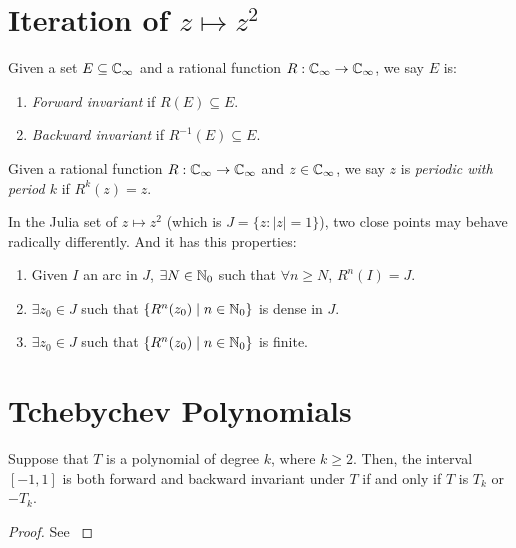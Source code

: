 \section{Iteration of $z \mapsto z^2$}
\label{sec:iteratcion_of_z_squared}

\begin{definition}
    Given a set $E \subseteq \mathbb{C}_\infty$ and a rational function $R: \mathbb{C}_\infty \to
    \mathbb{C}_\infty$, we say $E$ is:
    \begin{enumerate}[label=(\alph*)]
        \item \emph{Forward invariant} if $R(E) \subseteq E$.
        \item \emph{Backward invariant} if $R^{-1}(E) \subseteq E$.
    \end{enumerate}
\end{definition}

\begin{definition}
    Given a rational function $R: \mathbb{C}_\infty \to \mathbb{C}_\infty$ and $z \in \mathbb{C}_\infty$, we say $z$
    is \emph{periodic with period $k$} if $R^k(z) = z$.
\end{definition}

In the Julia set of $z \mapsto z^2$ (which is $J = \{z : |z| = 1\}$), two close
points may behave radically differently. And it has this properties:
\begin{enumerate}[label=(\roman*)]
    \item Given $I$ an arc in $J$, $\exists N \in \mathbb{N}_0$ such that $\forall n
    \geq N$, $R^n(I) = J$.
    \item $\exists z_0 \in J$ such that $\{R^n(z_0) \mid n \in \mathbb{N}_0\}$ is
    dense in $J$.
    \item $\exists z_0 \in J$ such that $\{R^n(z_0) \mid n \in \mathbb{N}_0\}$ is
    finite.
\end{enumerate}

\section{Tchebychev Polynomials}
\label{sec:tchebychev_polynomials}

\begin{theorem}
    Suppose that $T$ is a polynomial of degree $k$, where $k \geq 2$. Then, the
    interval $[-1, 1]$ is both forward and backward invariant under $T$ if and
    only if $T$ is $T_k$ or $-T_k$.
\end{theorem}
\begin{proof}
    See \cite[11--12]{Beardon1991}
\end{proof}

